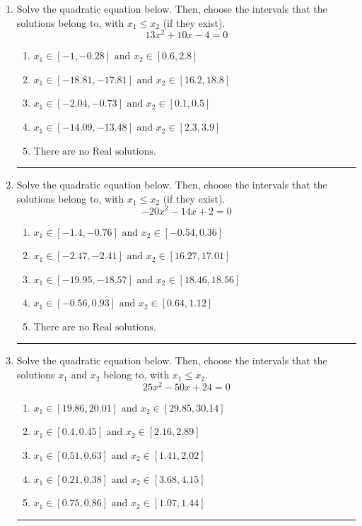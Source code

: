 \documentclass[14pt]{extbook}
\newcommand{\litem}[1]{\item#1\hspace*{-1cm}\rule{\textwidth}{0.4pt}}
\begin{document}
\begin{enumerate}
\litem{
Solve the quadratic equation below. Then, choose the intervals that the solutions belong to, with $x_1 \leq x_2$ (if they exist).\[ 13x^{2} +10 x -4 = 0 \]\begin{enumerate}[label=\Alph*.]
\item \( x_1 \in [-1, -0.28] \text{ and } x_2 \in [0.6, 2.8] \)
\item \( x_1 \in [-18.81, -17.81] \text{ and } x_2 \in [16.2, 18.8] \)
\item \( x_1 \in [-2.04, -0.73] \text{ and } x_2 \in [0.1, 0.5] \)
\item \( x_1 \in [-14.09, -13.48] \text{ and } x_2 \in [2.3, 3.9] \)
\item \( \text{There are no Real solutions.} \)

\end{enumerate} }
\litem{
Solve the quadratic equation below. Then, choose the intervals that the solutions belong to, with $x_1 \leq x_2$ (if they exist).\[ -20x^{2} -14 x + 2 = 0 \]\begin{enumerate}[label=\Alph*.]
\item \( x_1 \in [-1.4, -0.76] \text{ and } x_2 \in [-0.54, 0.36] \)
\item \( x_1 \in [-2.47, -2.41] \text{ and } x_2 \in [16.27, 17.01] \)
\item \( x_1 \in [-19.95, -18.57] \text{ and } x_2 \in [18.46, 18.56] \)
\item \( x_1 \in [-0.56, 0.93] \text{ and } x_2 \in [0.64, 1.12] \)
\item \( \text{There are no Real solutions.} \)

\end{enumerate} }
\litem{
Solve the quadratic equation below. Then, choose the intervals that the solutions $x_1$ and $x_2$ belong to, with $x_1 \leq x_2$.\[ 25x^{2} -50 x + 24 = 0 \]\begin{enumerate}[label=\Alph*.]
\item \( x_1 \in [19.86, 20.01] \text{ and } x_2 \in [29.85, 30.14] \)
\item \( x_1 \in [0.4, 0.45] \text{ and } x_2 \in [2.16, 2.89] \)
\item \( x_1 \in [0.51, 0.63] \text{ and } x_2 \in [1.41, 2.02] \)
\item \( x_1 \in [0.21, 0.38] \text{ and } x_2 \in [3.68, 4.15] \)
\item \( x_1 \in [0.75, 0.86] \text{ and } x_2 \in [1.07, 1.44] \)


\end{enumerate}}
\end{enumerate}
\end{document}
